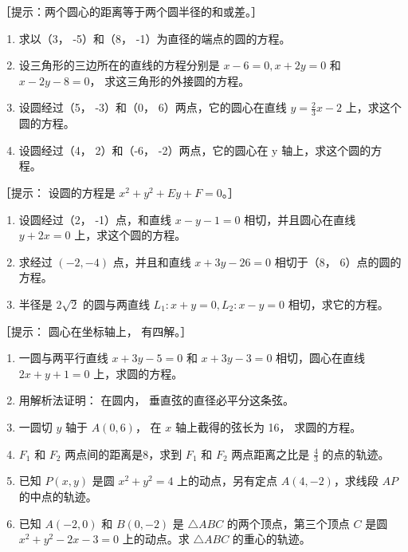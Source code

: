 ［提示：两个圆心的距离等于两个圆半径的和或差。］

\begin{enumerate}
\def\labelenumi{\arabic{enumi}.}
\setcounter{enumi}{4}
\item
  求以（3， -5）和（8， -1）为直径的端点的圆的方程。
\item
  设三角形的三边所在的直线的方程分别是 \(x - 6 = 0, x + 2y = 0\) 和
  \(x - 2y - 8 = 0\)， 求这三角形的外接圆的方程。
\item
  设圆经过（5， -3）和（0， 6）两点，它的圆心在直线
  \(y = \frac{2}{3} x - 2\) 上，求这个圆的方程。
\item
  设圆经过（4， 2）和（-6， -2）两点，它的圆心在 y
  轴上，求这个圆的方程。
\end{enumerate}

［提示： 设圆的方程是 \(x^{2}+y^{2}+Ey+F=0\)。］

\begin{enumerate}
\def\labelenumi{\arabic{enumi}.}
\setcounter{enumi}{8}
\item
  设圆经过（2， -1）点，和直线 \(x - y - 1 = 0\) 相切，并且圆心在直线
  \(y + 2x = 0\) 上，求这个圆的方程。
\item
  求经过 \((-2, -4)\) 点，并且和直线 \(x + 3y - 26 = 0\) 相切于（8，
  6）点的圆的方程。
\item
  半径是 \(2\sqrt{2}\) 的圆与两直线
  \(L_{1}: x + y = 0, L_{2}: x - y = 0\) 相切，求它的方程。
\end{enumerate}

［提示： 圆心在坐标轴上， 有四解。］

\begin{enumerate}
\def\labelenumi{\arabic{enumi}.}
\setcounter{enumi}{11}
\item
  一圆与两平行直线 \(x + 3y - 5 = 0\) 和 \(x + 3y - 3 = 0\)
  相切，圆心在直线 \(2x + y + 1 = 0\) 上，求圆的方程。
\item
  用解析法证明： 在圆内， 垂直弦的直径必平分这条弦。
\item
  一圆切 \(y\) 轴于 \(A(0,6)\)， 在 \(x\) 轴上截得的弦长为 16，
  求圆的方程。
\item
  \(F_{1}\) 和 \(F_{2}\) 两点间的距离是8，求到 \(F_{1}\) 和 \(F_{2}\)
  两点距离之比是 \(\frac{4}{3}\) 的点的轨迹。
\item
  已知 \(P(x, y)\) 是圆 \(x^2 + y^2 = 4\) 上的动点，另有定点
  \(A(4, -2)\)，求线段 \(AP\) 的中点的轨迹。
\item
  已知 \(A(-2,0)\) 和 \(B(0,-2)\) 是 \(\triangle ABC\)
  的两个顶点，第三个顶点 \(C\) 是圆 \(x^{2} + y^{2} - 2x - 3 = 0\)
  上的动点。求 \(\triangle ABC\) 的重心的轨迹。
\end{enumerate}

